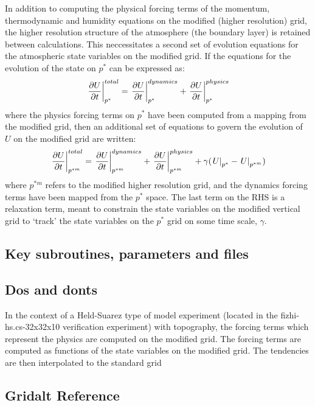 \vspace*{-0.5in}
In addition to computing the physical forcing terms of the momentum,
thermodynamic and humidity equations on the modified (higher resolution)
grid, the higher resolution structure of the atmosphere (the boundary
layer) is retained between calculations. This neccessitates a second 
set of evolution equations for the atmospheric state variables on the 
modified grid. If the equations for the evolution of the state
on $p^*$ can be expressed as:
\[
\left . {\partial U \over {\partial t}} \right |_{p^*}^{total} = 
\left . {\partial U \over {\partial t}} \right |_{p^*}^{dynamics} + 
\left . {\partial U \over {\partial t}} \right |_{p^*}^{physics}
\]
where the physics forcing terms on $p^*$ have been computed from a
mapping from the modified grid, then an additional set of equations
to govern the evolution of $U$ on the modified grid are written:
\[
\left . {\partial U \over {\partial t}} \right |_{p^{*m}}^{total} = 
\left . {\partial U \over {\partial t}} \right |_{p^{*m}}^{dynamics} + 
\left . {\partial U \over {\partial t}} \right |_{p^{*m}}^{physics} +
\gamma ({\left . U \right |_{p^*}} - {\left . U \right |_{p^{*m}}})
\]
where $p^{*m}$ refers to the modified higher resolution grid, and
the dynamics forcing terms have been mapped from the $p^*$ space.
The last term on the RHS is a relaxation term, meant to constrain
the state variables on the modified vertical grid to `track' the
state variables on the $p^*$ grid on some time scale, $\gamma$.

\subsection {Key subroutines, parameters and files } 

\subsection {Dos and donts}

In the context of a Held-Suarez type of model experiment (located
in the fizhi-hs.cs-32x32x10 verification experiment) with
topography, the forcing terms which represent the physics are computed on 
the modified grid. The forcing terms are computed as functions of the
state variables on the modified grid. The tendencies are then interpolated
to the standard grid

\subsection {Gridalt Reference} 
